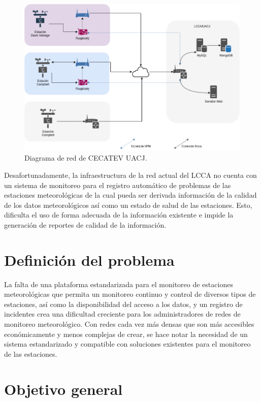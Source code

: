 

\begin{figure}[!ht]
	\centering
	\includegraphics[width=.80\linewidth]{images/diagrams/red_lcca.drawio.png}
	\caption{Diagrama de red de CECATEV UACJ.}
	\label{fig:current_network}
\end{figure}

Desafortunadamente, la infraestructura de la red actual del LCCA no cuenta con un sistema de monitoreo para el registro automático de problemas de las estaciones meteorológicas de la cual pueda ser derivada información de la calidad de los datos meteorológicos así como un estado de salud de las estaciones. Esto, dificulta el uso de forma adecuada de la información existente e impide la generación de reportes de calidad de la información.

\section{Definición del problema}

La falta de una plataforma estandarizada para el monitoreo de estaciones meteorológicas que permita un monitoreo continuo y control de diversos tipos de estaciones, así como la disponibilidad del acceso a los datos, y un registro de incidentes crea una dificultad creciente para los administradores de redes de monitoreo meteorológico. Con redes cada vez más densas que son más accesibles económicamente y menos complejas de crear, se hace notar la necesidad de un sistema estandarizado y compatible con soluciones existentes para el monitoreo de las estaciones.

\section{Objetivo general}

